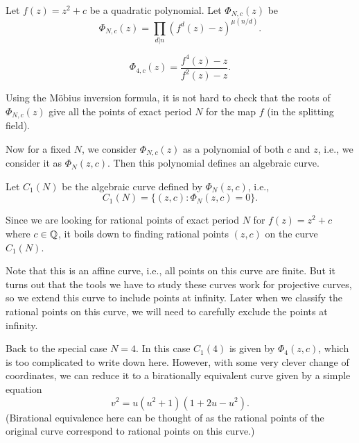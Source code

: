 \begin{definition}
  Let $f(z) = z^2 + c$ be a quadratic polynomial. Let $\Phi_{N, c}(z)$
  be
  \[
  \Phi_{N,c}(z) = \prod_{d|n}(f^d(z) - z)^{\mu(n/d)}.
  \]
\end{definition}

\begin{example}
  \[
  \Phi_{4, c}(z) = \frac{f^4(z) - z}{f^2(z) - z}.
  \]
\end{example}

Using the M\"obius inversion formula, it is not hard to check that the
roots of $\Phi_{N, c}(z)$ give all the points of exact period $N$ for
the map $f$ (in the splitting field).

Now for a fixed $N$, we consider $\Phi_{N, c}(z)$ as a polynomial of
both $c$ and $z$, i.e., we consider it as $\Phi_N(z, c)$. Then this
polynomial defines an algebraic curve.

\begin{definition}
  Let $C_1(N)$ be the algebraic curve defined by $\Phi_N(z, c)$, i.e.,
  \[
  C_1(N) = \{(z, c) : \Phi_N(z, c) = 0\}.
  \]
\end{definition}

Since we are looking for rational points of exact period $N$ for $f(z)
= z^2 + c$ where $c \in \mathbb{Q}$, it boils down to finding rational points
$(z, c)$ on the curve $C_1(N)$.

Note that this is an affine curve, i.e., all points on this curve are
finite. But it turns out that the tools we have to study these curves
work for projective curves, so we extend this curve to include points
at infinity. Later when we classify the rational points on this curve,
we will need to carefully exclude the points at infinity.

%

Back to the special case $N = 4$. In this case $C_1(4)$ is given by
$\Phi_4(z, c)$, which is too complicated to write down here. However,
with some very clever change of coordinates, we can reduce it to a
birationally equivalent curve given by a simple equation
\[
v^2 = u(u^2 + 1)(1 + 2u - u^2).
\]
(Birational equivalence here can be thought of as the rational points
of the original curve correspond to rational points on this curve.)

